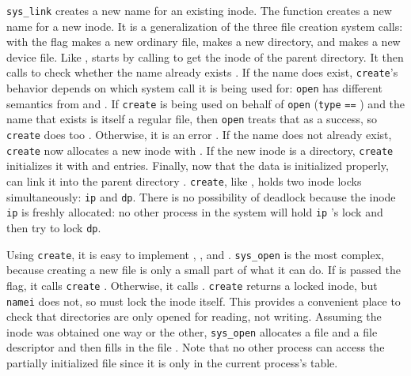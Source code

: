 \lstinline{sys_link}
creates a new name for an existing inode.
The function
creates a new name for a new inode.
It is a generalization of the three file creation
system calls:
with the
flag makes a new ordinary file,
makes a new directory,
and
makes a new device file.
Like
,
starts by calling
to get the inode of the parent directory.
It then calls
to check whether the name already exists
.
If the name does exist, 
\lstinline{create}'s
behavior depends on which system call it is being used for:
\lstinline{open}
has different semantics from 
and
.
If
\lstinline{create}
is being used on behalf of
\lstinline{open}
(\lstinline{type}
\lstinline{==}
)
and the name that exists is itself
a regular file,
then 
\lstinline{open}
treats that as a success,
so
\lstinline{create}
does too
.
Otherwise, it is an error
.
If the name does not already exist,
\lstinline{create}
now allocates a new inode with
.
If the new inode is a directory, 
\lstinline{create}
initializes it with
and
entries.
Finally, now that the data is initialized properly,
can link it into the parent directory
.
\lstinline{create},
like
,
holds two inode locks simultaneously:
\lstinline{ip}
and
\lstinline{dp}.
There is no possibility of deadlock because
the inode
\lstinline{ip}
is freshly allocated: no other process in the system
will hold 
\lstinline{ip} 's
lock and then try to lock
\lstinline{dp}.

Using
\lstinline{create},
it is easy to implement
,
,
and
.
\lstinline{sys_open}
is the most complex, because creating a new file is only
a small part of what it can do.
If
is passed the
flag, it calls
\lstinline{create}
.
Otherwise, it calls
.
\lstinline{create}
returns a locked inode, but 
\lstinline{namei}
does not, so
must lock the inode itself.
This provides a convenient place to check that directories
are only opened for reading, not writing.
Assuming the inode was obtained one way or the other,
\lstinline{sys_open}
allocates a file and a file descriptor
and then fills in the file
.
Note that no other process can access the partially initialized file since it is only
in the current process's table.

